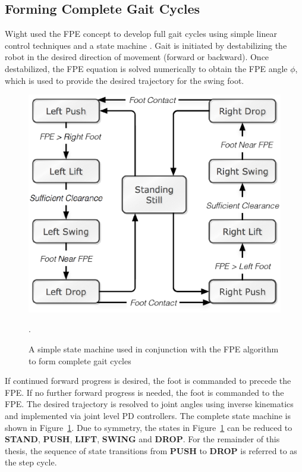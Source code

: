 \subsection{Forming Complete Gait Cycles} %
\label{sub:gait_cycles}
Wight used the FPE concept to develop full gait cycles using simple linear control techniques and a state machine \cite{Wight:2008vt}. Gait is initiated by destabilizing the robot in the desired direction of movement (forward or backward). Once destabilized, the FPE equation is solved numerically to obtain the FPE angle $\phi$, which is used to provide the desired trajectory for the swing foot. 

\begin{figure}[!h]
	\centering
    \includegraphics[scale=0.8]{fig/fpe/statemachine.eps}
  	\caption{A simple state machine used in conjunction with the FPE algorithm to form complete gait cycles}.
	\label{fig:statemachine}
\end{figure}

If continued forward progress is desired, the foot is commanded to precede the FPE. If no further forward progress is needed, the foot is commanded to the FPE. The desired trajectory is resolved to joint angles using inverse kinematics and implemented via joint level PD controllers. The complete state machine is shown in Figure~\ref{fig:statemachine}. Due to symmetry, the states in Figure~\ref{fig:statemachine} can be reduced to \textbf{STAND}, \textbf{PUSH}, \textbf{LIFT}, \textbf{SWING} and \textbf{DROP}. For the remainder of this thesis, the sequence of state transitions from \textbf{PUSH} to \textbf{DROP} is referred to as the step cycle.


